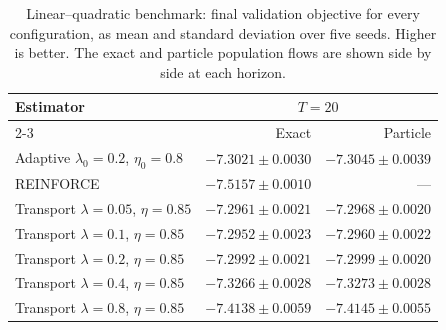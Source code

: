 \begin{table}[H]
\centering
\begin{tabular}{lrr}
\toprule
Estimator & \multicolumn{2}{c}{$T=20$} \\
\cmidrule(lr){2-3}
 & Exact & Particle \\
\midrule
Adaptive $\lambda_0=0.2$, $\eta_0=0.8$ & $-7.3021\pm0.0030$ & $-7.3045\pm0.0039$ \\
REINFORCE & $-7.5157\pm0.0010$ & --- \\
Transport $\lambda=0.05$, $\eta=0.85$ & $-7.2961\pm0.0021$ & $-7.2968\pm0.0020$ \\
Transport $\lambda=0.1$, $\eta=0.85$ & $-7.2952\pm0.0023$ & $-7.2960\pm0.0022$ \\
Transport $\lambda=0.2$, $\eta=0.85$ & $-7.2992\pm0.0021$ & $-7.2999\pm0.0020$ \\
Transport $\lambda=0.4$, $\eta=0.85$ & $-7.3266\pm0.0028$ & $-7.3273\pm0.0028$ \\
Transport $\lambda=0.8$, $\eta=0.85$ & $-7.4138\pm0.0059$ & $-7.4145\pm0.0055$ \\
\bottomrule
\end{tabular}
\caption{Linear--quadratic benchmark: final validation objective for every configuration, as mean and standard deviation over five seeds. Higher is better. The exact and particle population flows are shown side by side at each horizon.}
\label{tab:full-objectives-lq}
\end{table}
